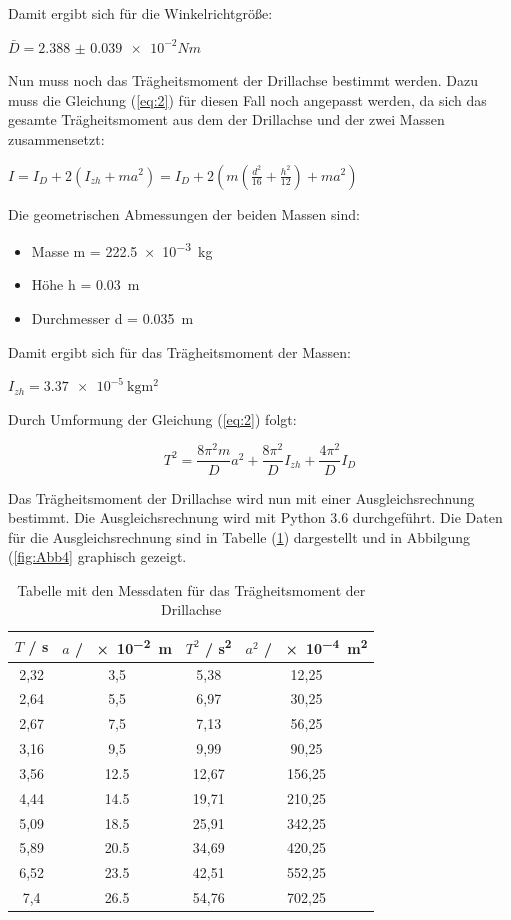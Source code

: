 Damit ergibt sich für die Winkelrichtgröße:

\centerline{$\bar{D} = \num{2.388(39)e-2} Nm$}

Nun muss noch das Trägheitsmoment der Drillachse bestimmt werden. Dazu muss
die Gleichung (\ref{eq:2}) für diesen Fall noch angepasst werden, da sich das gesamte
Trägheitsmoment aus dem der Drillachse und der zwei Massen zusammensetzt:

$I = I_D + 2(I_{zh} + ma^2) = I_D + 2(m \left( \frac{d^2}{16} + \frac{h^2}{12} \right)
+ ma^2)$

Die geometrischen Abmessungen der beiden Massen sind:

\begin{itemize}
  \item Masse m = \SI{222.5e-3}{\kilo\gram}
  \item Höhe h = \SI{0.03}{\meter}
  \item Durchmesser d = \SI{0.035}{\meter}
\end{itemize}

Damit ergibt sich für das Trägheitsmoment der Massen:

\centerline{$I_{zh} = \SI{3.37e-5}{\kilo\gram\meter\squared}$}

Durch Umformung der Gleichung (\ref{eq:2}) folgt:

\begin{equation}
  T^2 = \frac{8\pi^2m}{D} a^2 + \frac{8\pi^2}{D} I_{zh} + \frac{4\pi^2}{D} I_D
  \label{eq:6}
\end{equation}


Das Trägheitsmoment der Drillachse wird nun mit einer Ausgleichsrechnung bestimmt.
Die Ausgleichsrechnung wird mit Python 3.6 durchgeführt. Die Daten für die Ausgleichsrechnung
sind in Tabelle (\ref{fig:tab2}) dargestellt und in Abbilgung (\ref{fig:Abb4} graphisch gezeigt.

\begin{table}
  \centering
  \caption{Tabelle mit den Messdaten für das Trägheitsmoment der Drillachse}
  \begin{tabular}{c c c c}
    \toprule
    $T$ / \si{\second} & $a$ / \SI{e-2}{\meter} & $T^2$ / \si{\second\squared} &
    $a^2$ / \SI{e-4}{\meter\squared} \\
    \midrule
    2,32 & 3,5  & 5,38  & 12,25 \\
    2,64 & 5,5  & 6,97  & 30,25 \\
    2,67 & 7,5  & 7,13  & 56,25 \\
    3,16 & 9,5  & 9,99  & 90,25 \\
    3,56 & 12.5 & 12,67 & 156,25 \\
    4,44 & 14.5 & 19,71 & 210,25 \\
    5,09 & 18.5 & 25,91 & 342,25 \\
    5,89 & 20.5 & 34,69 & 420,25 \\
    6,52 & 23.5 & 42,51 & 552,25 \\
    7,4  & 26.5 & 54,76 &  702,25 \\
    \bottomrule
  \end{tabular}
  \label{fig:tab2}
\end{table}

